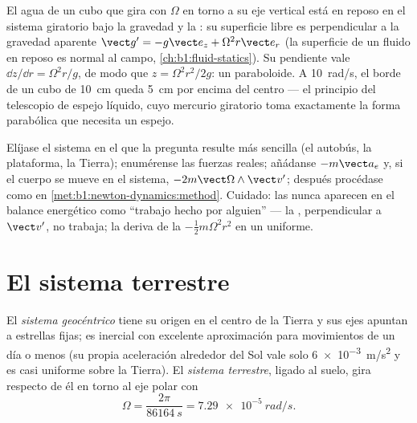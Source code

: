 \begin{example}\label{ex:b1:non-inertial-frames:bucket}
El agua de un cubo que gira con $\Omega$ en torno a su eje vertical está en
reposo en el sistema giratorio bajo la gravedad y la : su
superficie libre es perpendicular a la gravedad aparente $\vect g' = -g\vect e_z +
\Omega^2r\vect e_r$ (la superficie de un fluido en reposo es normal al campo,
\cref{ch:b1:fluid-statics}). Su pendiente vale $\dd z/\dd r = \Omega^2r/g$,
de modo que $z = \Omega^2r^2/2g$: un paraboloide. A \qty{10}{rad/s}, el
borde de un cubo de \qty{10}{cm} queda \qty{5}{cm} por encima del centro
--- el principio del telescopio de espejo líquido, cuyo mercurio giratorio
toma exactamente la forma parabólica que necesita un espejo.
\end{example}

\begin{method}\label{met:b1:non-inertial-frames:method}
Elíjase el sistema en el que la pregunta resulte más sencilla (el
autobús, la plataforma, la Tierra); enumérense las fuerzas reales;
añádanse $-m\vect a_e$ y, si el cuerpo se mueve en el sistema,
$-2m\vect\Omega\wedge\vect v'$; después procédase como en
\cref{met:b1:newton-dynamics:method}. Cuidado: las 
nunca aparecen en el balance energético como ``trabajo hecho por
alguien'' --- la , perpendicular a $\vect v'$, no
trabaja; la  deriva de la 
$-\tfrac12 m\Omega^2r^2$ en un  uniforme.
\end{method}

\section{El sistema terrestre}

\begin{definition}\label{def:b1:non-inertial-frames:earth}
El \emph{sistema geocéntrico} tiene su origen en el centro de la Tierra y
sus ejes apuntan a estrellas fijas; es inercial con excelente
aproximación para movimientos de un día o menos (su propia aceleración
alrededor del Sol vale solo \qty{6e-3}{m/s^2} y es casi uniforme sobre la
Tierra). El \emph{sistema terrestre}, ligado al suelo, gira respecto de él
en torno al eje polar con
\[
\Omega = \frac{2\pi}{\qty{86164}{s}} = \qty{7.29e-5}{rad/s} .
\]
\end{definition}

